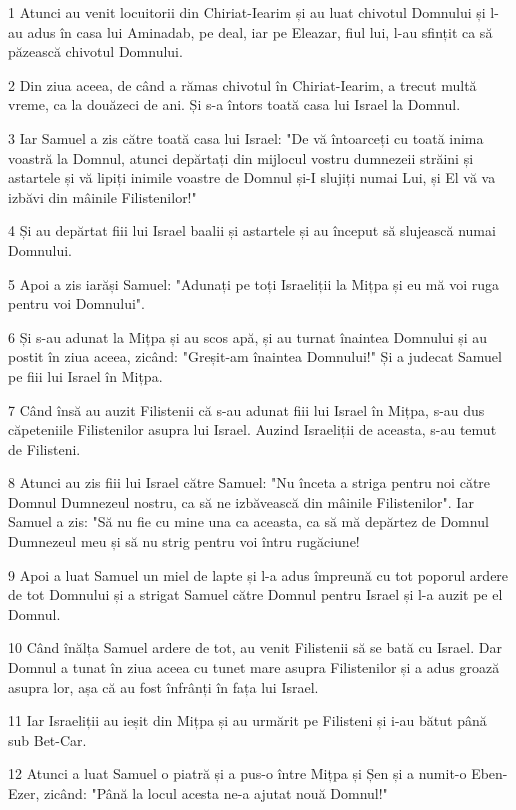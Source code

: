 \par 1 Atunci au venit locuitorii din Chiriat-Iearim și au luat chivotul Domnului și l-au adus în casa lui Aminadab, pe deal, iar pe Eleazar, fiul lui, l-au sfințit ca să păzească chivotul Domnului.
\par 2 Din ziua aceea, de când a rămas chivotul în Chiriat-Iearim, a trecut multă vreme, ca la douăzeci de ani. Și s-a întors toată casa lui Israel la Domnul.
\par 3 Iar Samuel a zis către toată casa lui Israel: "De vă întoarceți cu toată inima voastră la Domnul, atunci depărtați din mijlocul vostru dumnezeii străini și astartele și vă lipiți inimile voastre de Domnul și-I slujiți numai Lui, și El vă va izbăvi din mâinile Filistenilor!"
\par 4 Și au depărtat fiii lui Israel baalii și astartele și au început să slujească numai Domnului.
\par 5 Apoi a zis iarăși Samuel: "Adunați pe toți Israeliții la Mițpa și eu mă voi ruga pentru voi Domnului".
\par 6 Și s-au adunat la Mițpa și au scos apă, și au turnat înaintea Domnului și au postit în ziua aceea, zicând: "Greșit-am înaintea Domnului!" Și a judecat Samuel pe fiii lui Israel în Mițpa.
\par 7 Când însă au auzit Filistenii că s-au adunat fiii lui Israel în Mițpa, s-au dus căpeteniile Filistenilor asupra lui Israel. Auzind Israeliții de aceasta, s-au temut de Filisteni.
\par 8 Atunci au zis fiii lui Israel către Samuel: "Nu înceta a striga pentru noi către Domnul Dumnezeul nostru, ca să ne izbăvească din mâinile Filistenilor". Iar Samuel a zis: "Să nu fie cu mine una ca aceasta, ca să mă depărtez de Domnul Dumnezeul meu și să nu strig pentru voi întru rugăciune!
\par 9 Apoi a luat Samuel un miel de lapte și l-a adus împreună cu tot poporul ardere de tot Domnului și a strigat Samuel către Domnul pentru Israel și l-a auzit pe el Domnul.
\par 10 Când înălța Samuel ardere de tot, au venit Filistenii să se bată cu Israel. Dar Domnul a tunat în ziua aceea cu tunet mare asupra Filistenilor și a adus groază asupra lor, așa că au fost înfrânți în fața lui Israel.
\par 11 Iar Israeliții au ieșit din Mițpa și au urmărit pe Filisteni și i-au bătut până sub Bet-Car.
\par 12 Atunci a luat Samuel o piatră și a pus-o între Mițpa și Șen și a numit-o Eben-Ezer, zicând: "Până la locul acesta ne-a ajutat nouă Domnul!"

